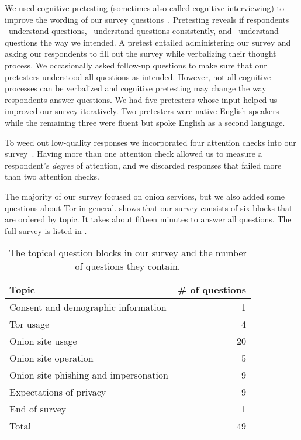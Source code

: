 We used cognitive pretesting (sometimes also called cognitive interviewing) to
improve the wording of our survey questions~\cite{Collins2003a}.  Pretesting
reveals if respondents \first~understand questions, \second~understand questions
consistently, and \third~understand questions the way we intended.  A pretest
entailed administering our survey and asking our respondents to fill out the
survey while verbalizing their thought process.  We occasionally asked follow-up
questions to make sure that our pretesters understood all questions as intended.
However, not all cognitive processes can be verbalized and cognitive pretesting
may change the way respondents answer questions.  We had five pretesters whose
input helped us improved our survey iteratively.  Two pretesters were native
English speakers while the remaining three were fluent but spoke English as a
second language.

To weed out low-quality responses we incorporated four attention checks into our
survey~\cite{Berinsky2014a}.  Having more than one attention check 
allowed us to measure a respondent's \emph{degree} of attention, and we
discarded responses that failed more than two attention checks.

The majority of our survey focused on onion services, but we also added some
questions about Tor in general.   shows that our
survey consists of six blocks that are ordered by topic.  It takes about fifteen
minutes to answer all questions.  The full survey is listed in
.

\begin{table}[t]
	\centering
	\caption{The topical question blocks in our survey and the number of
	questions they contain.}
	\label{tab:survey-structure}
	\begin{tabular}{l r}
	\toprule
	Topic & \# of questions \\
	\midrule
	Consent and demographic information & 1 \\
	Tor usage & 4 \\
	Onion site usage & 20 \\
	Onion site operation & 5 \\
	Onion site phishing and impersonation & 9 \\
	Expectations of privacy & 9 \\
	End of survey & 1 \\
	\midrule
	Total & 49 \\
	\bottomrule
	\end{tabular}
\end{table}

